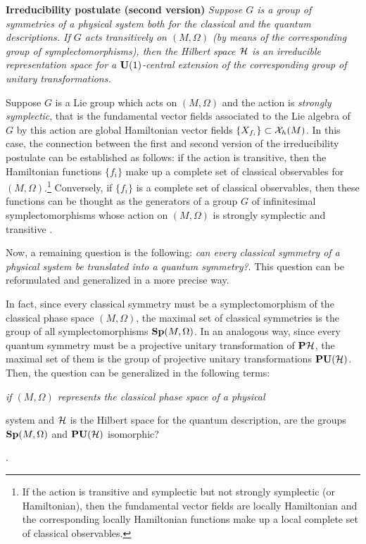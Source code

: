 \documentclass[12pt]{article}
\def\H{{\cal H}}
\begin{document}
\noindent
{\bf Irreducibility postulate (second version)}
{\it Suppose $G$ is a group of symmetries of a physical system
both for the classical and the quantum descriptions.
If $G$ acts transitively on $(M, \Omega )$
(by means of the corresponding group of symplectomorphisms),
then the Hilbert space $\H$ is an irreducible representation space
for a ${\bf U}(1)$-central extension of the corresponding
group of unitary transformations.
}

Suppose $G$ is a Lie group which acts on $(M,\Omega )$
and the action is {\it strongly symplectic},
that is the fundamental vector fields associated
to the Lie algebra of $G$ by this action are
global Hamiltonian vector fields $\{ X_{f_i} \} \subset {\cal X}_h(M)$.
In this case, the connection between the first and second version
of the irreducibility postulate can be established as follows:
if the action is transitive, then the Hamiltonian functions $\{ f_i \}$
make up a
complete set of classical observables for $(M,\Omega )$.\footnote{
If the action is transitive and symplectic but not strongly symplectic
(or Hamiltonian),
then the fundamental vector fields are locally Hamiltonian
and the corresponding locally Hamiltonian functions
make up a local complete set of classical observables.
}
Conversely, if $\{ f_i \}$ is a complete set of classical observables,
then these functions can be thought as the generators of a
group $G$ of infinitesimal symplectomorphisms
whose action on $(M,\Omega )$ is strongly symplectic and
transitive \cite{Ki-gq}.

Now, a remaining question is the following:
{\it can every classical symmetry of a physical system
be translated into a quantum symmetry?}.
This question can be reformulated and generalized in a more precise way.

In fact, since every classical symmetry must be
a symplectomorphism of the classical phase space $(M,\Omega )$,
the maximal set of classical symmetries is
the group of all symplectomorphisms ${\bf Sp}(M,\Omega )$.
In an analogous way, since every quantum symmetry must be
a projective unitary transformation of ${\bf P}\H$,
the maximal set of them is the group of projective unitary
transformations ${\bf PU}(\H )$.
Then, the question can be generalized in the following terms:
{\it if $(M,\Omega )$ represents the classical phase space of a physical

system
and $\H$ is the Hilbert space for the quantum description,
are the groups ${\bf Sp}(M,\Omega )$ and ${\bf PU}(\H )$ isomorphic?}.
\end{document}
